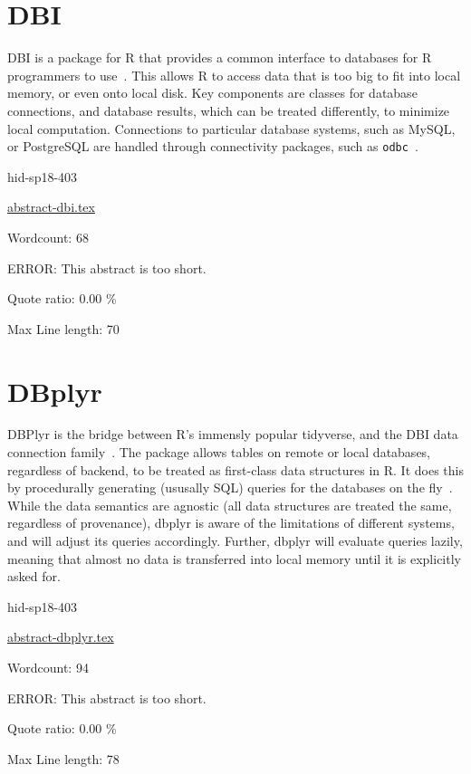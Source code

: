 \section{DBI}

DBI is a package for R that provides a common interface to databases
for R programmers to use~\cite{hid-sp18-403-R-dbi}. This allows
R to access data that is too big to fit into local memory, or even
onto local disk. Key components are classes for database connections,
and database results, which can be treated differently, to minimize
local computation. Connections to particular database systems, such as
MySQL, or PostgreSQL are handled through connectivity packages, such
as \texttt{odbc}~\cite{hid-sp18-403-rstudio-odbc}.


\begin{IU}

hid-sp18-403

\href{https://github.com/cloudmesh-community/hid-sp18-403/blob/master//technology/abstract-dbi.tex}{abstract-dbi.tex}

 

Wordcount: 68

ERROR: This abstract is too short.


Quote ratio: 0.00 \%
 
Max Line length: 70
\end{IU}

\section{DBplyr}

DBPlyr is the bridge between R's immensly popular tidyverse, and the
DBI data connection family~\cite{hid-sp18-403-tidy-dbplyr}. The package allows
tables on remote or local databases, regardless of backend, to be
treated as first-class data structures in R. It does this by
procedurally generating (ususally SQL) queries for the databases on
the fly~\cite{hid-sp18-403-R-dbplyr}. While the data semantics are
agnostic (all data structures are treated the same, regardless of
provenance), dbplyr is aware of the limitations of different systems,
and will adjust its queries accordingly. Further, dbplyr will evaluate
queries lazily, meaning that almost no data is transferred into local
memory until it is explicitly asked for.


\begin{IU}

hid-sp18-403

\href{https://github.com/cloudmesh-community/hid-sp18-403/blob/master//technology/abstract-dbplyr.tex}{abstract-dbplyr.tex}

 

Wordcount: 94

ERROR: This abstract is too short.


Quote ratio: 0.00 \%
 
Max Line length: 78
\end{IU}

